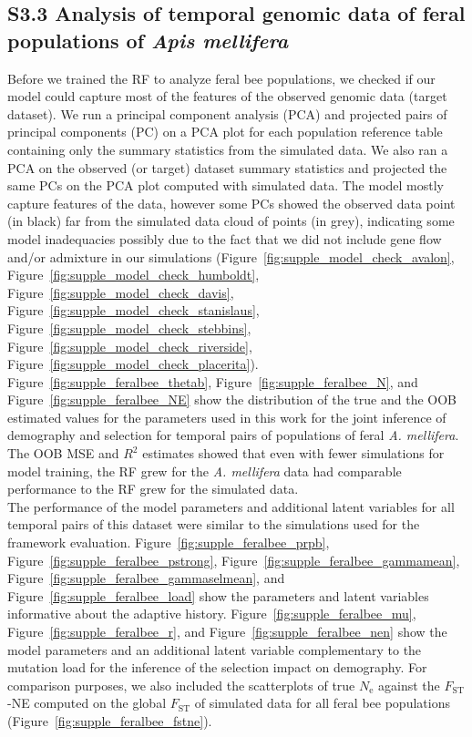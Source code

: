 \documentclass[a4paper, 12pt]{article}
\begin{document}
\subsection*{S3.3 Analysis of temporal genomic data of feral populations of \textit{Apis mellifera}}

Before we trained the RF to analyze feral bee populations, we checked if our model could capture most of the features of the observed genomic data (target dataset). We run a principal component analysis (PCA) and projected pairs of principal components (PC) on a PCA plot for each population reference table containing only the summary statistics from the simulated data. We also ran a PCA on the observed (or target) dataset summary statistics and projected the same PCs on the PCA plot computed with simulated data. The model mostly capture features of the data, however some PCs showed the observed data point (in black) far from the simulated data cloud of points (in grey), indicating some model inadequacies possibly due to the fact that we did not include gene flow and/or admixture in our simulations (Figure~\ref{fig:supple_model_check_avalon}, Figure~\ref{fig:supple_model_check_humboldt}, Figure~\ref{fig:supple_model_check_davis}, Figure~\ref{fig:supple_model_check_stanislaus}, Figure~\ref{fig:supple_model_check_stebbins}, Figure~\ref{fig:supple_model_check_riverside}, Figure~\ref{fig:supple_model_check_placerita}).\\

Figure~\ref{fig:supple_feralbee_thetab}, Figure~\ref{fig:supple_feralbee_N}, and Figure~\ref{fig:supple_feralbee_NE} show the distribution of the true and the OOB estimated values for the parameters used in this work for the joint inference of demography and selection for temporal pairs of populations of feral \textit{A. mellifera}. The OOB MSE and $R^2$ estimates showed that even with fewer simulations for model training, the RF grew for the \textit{A. mellifera} data had comparable performance to the RF grew for the simulated data.\\

The performance of the model parameters and additional latent variables for all temporal pairs of this dataset were similar to the simulations used for the framework evaluation. Figure~\ref{fig:supple_feralbee_prpb}, Figure~\ref{fig:supple_feralbee_pstrong}, Figure~\ref{fig:supple_feralbee_gammamean}, Figure~\ref{fig:supple_feralbee_gammaselmean}, and Figure~\ref{fig:supple_feralbee_load} show the parameters and latent variables informative about the adaptive history. Figure~\ref{fig:supple_feralbee_mu}, Figure~\ref{fig:supple_feralbee_r}, and Figure~\ref{fig:supple_feralbee_nen} show the model parameters and an additional latent variable complementary to the mutation load for the inference of the selection impact on demography. For comparison purposes, we also included the scatterplots of true $N_{\mathrm{e}}$ against the $F_{\mathrm{ST}}$-NE computed on the global $F_{\mathrm{ST}}$ of simulated data for all feral bee populations (Figure~\ref{fig:supple_feralbee_fstne}).\\
\end{document}
